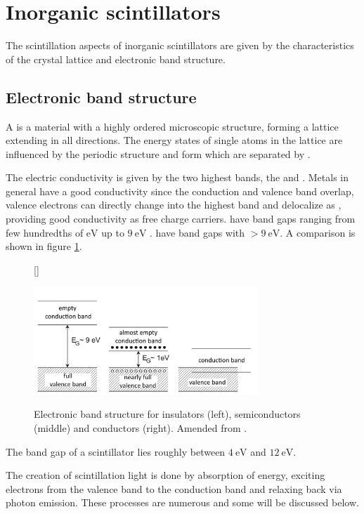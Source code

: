 \section{Inorganic scintillators}
The scintillation aspects of inorganic scintillators are given by the characteristics of the crystal lattice and electronic band structure.
\subsection{Electronic band structure} \label{ch:semiconducters} 
A  is a material with a highly ordered microscopic structure, forming a lattice extending in all directions. The energy states of single atoms in the lattice are influenced by the periodic structure and form  which are separated by . \par 
The electric conductivity is given by the two highest bands, the  and . Metals in general have a good conductivity since the conduction and valence band overlap, valence electrons can directly change into the highest band and delocalize as , providing good conductivity as free charge carriers.  have band gaps ranging from few hundredths of $\si{\eV}$ up to $\SI{9}{\eV}$ \cite{wermes}.  have band gaps with $>\SI{9}{\eV}$. A comparison is shown in figure \ref{fig:ch2:band_gaps}.    
\begin{figure}[b]
	[\FBwidth]
	{\caption[Electronic band structure]{Electronic band structure for insulators (left), semiconductors (middle) and conductors (right). Amended from \cite{wermes}.}   
		\label{fig:ch2:band_gaps}}
	{\includegraphics[width=0.75\textwidth]{./graphics/ch2/band_gaps.png}}
\end{figure}
The band gap of a scintillator lies roughly between $\SI{4}{\eV}$ and $\SI{12}{\eV}$. \par 
The creation of scintillation light is done by absorption of energy, exciting electrons from the valence band to the conduction band and relaxing back via photon emission. These processes are numerous and some will be discussed below.
